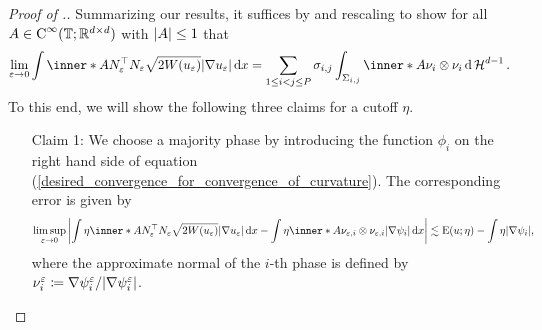 \begin{proof}[Proof of .]
	Summarizing our results, it suffices by 
	 and rescaling to show for all $ 
	A \in \operatorname{C}^{ \infty } ( \operatorname{\mathbb{T}} ; \mathbb{ R }^{ d \times d } ) $ with 
	$ \abs{ A } \leq 1 $ that
	\begin{equation}
		\label{desired_convergence_for_convergence_of_curvature}
		\lim_{ \varepsilon \to 0 }
		\int
		\inner*{ A }{ N_{ \varepsilon }^{ \top } N_{ \varepsilon } }
		\sqrt{ 2 W ( u_{ \varepsilon } ) }
		\abs{ \nabla u_{ \varepsilon } }
		\dd{ x }
		=
		\sum_{ 1 \leq i < j \leq P }
		\sigma_{ i , j }
		\int_{ \Sigma_{ i , j } }
		\inner*{ A }{ \nu_{ i } \otimes \nu_{ i } }
		\dd{ \hm^{ d - 1 } }.
	\end{equation}
	To this end, we will show the following three claims for a cutoff $ \eta $.
	\begin{itemize}[wide=0pt]
		\item[Claim 1:]
		We choose a majority phase by introducing the function $ \phi_{ i } $ 
		on the right hand side of equation 
		(\ref{desired_convergence_for_convergence_of_curvature}). The 
		corresponding error is given by
		\begin{equation*}
			\limsup_{ \varepsilon \to 0 }
			\abs{ 
				\int
				\eta 
				\inner*{ A }{ N_{ \varepsilon }^{ \top } N_{ \varepsilon } }
				\sqrt{ 2 W ( u_{ \varepsilon } ) } \abs{ \nabla u_{ \varepsilon 
				} } 
				\dd{ x }
				-
				\int
				\eta
				\inner*{ A }{ \nu_{ \varepsilon, i } \otimes \nu_{ 
						\varepsilon , i } }
				\abs{ \nabla \psi_{ i } }
				\dd{ x }
			}
			\lesssim
			\energy ( u ; \eta ) 
			-
			\int
			\eta
			\abs{ \nabla \psi_{ i } },
		\end{equation*}
		where the approximate normal of the $ i$-th phase is defined by $ \nu_{ 
		i }^{ \varepsilon } \coloneqq \nabla \psi_{ i }^{ \varepsilon } / \abs{ 
		\nabla \psi_{ i }^{ \varepsilon } } $.
		

\end{itemize}
\end{proof}
